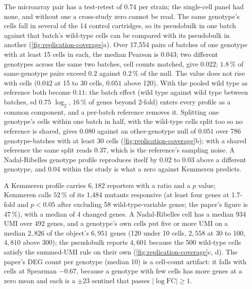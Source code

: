  The microarray pair has a test-retest of
$0.74$ per strain; the single-cell panel had none, and without one a cross-study zero
cannot be read. The same genotype's cells fall in several of the 14 control cartridges,
so its pseudobulk in one batch against that batch's wild-type cells can be compared with
its pseudobulk in another (\cref{fig:replication-coverage}a). Over 17{,}554 pairs of
batches of one genotype with at least 15 cells in each, the median Pearson is $0.043$;
two different genotypes across the same two batches, cell counts matched, give $0.022$;
$1.8\,\%$ of same-genotype pairs exceed $0.2$ against $0.2\,\%$ of the null. The value
does not rise with cells ($0.042$ at 15 to 30 cells, $0.051$ above 120). With the pooled
wild type as reference both become $0.11$: the batch effect (wild type against wild
type between batches, sd $0.75$ $\log_2$, $16\,\%$ of genes beyond 2-fold) enters every
profile as a common component, and a per-batch reference removes it. Splitting one
genotype's cells within one batch in half, with the wild-type cells split too so no
reference is shared, gives $0.080$ against an other-genotype null of $0.051$ over 786
genotype-batches with at least 30 cells (\cref{fig:replication-coverage}b); with a
shared reference the same split reads $0.37$, which is the reference's sampling noise. A
Nadal-Ribelles genotype profile reproduces itself by $0.02$ to $0.03$ above a different
genotype, and $0.04$ within the study is what a zero against Kemmeren predicts.

 A Kemmeren profile carries $6{,}182$ reporters with a ratio
and a $p$ value; Kemmeren calls $52\,\%$ of its 1{,}484 mutants responsive (at least
four genes at 1.7-fold and $p < 0.05$ after excluding 58 wild-type-variable genes; the
paper's figure is $47\,\%$), with a median of 4 changed genes. A Nadal-Ribelles cell has
a median 934 UMI over 492 genes, and a genotype's own cells put five or more UMI on a
median $2{,}826$ of the object's $6{,}951$ genes (120 under 10 cells, $2{,}558$ at 30 to
100, $4{,}810$ above 300); the pseudobulk reports $4{,}601$ because the 500 wild-type
cells satisfy the summed-UMI rule on their own (\cref{fig:replication-coverage}c, d).
The paper's DEG count per genotype (median 10) is a cell-count artifact: it falls with
cells at Spearman $-0.67$, because a genotype with few cells has more genes at a zero
mean and each is a $\pm 23$ sentinel that passes $|\log\mathrm{FC}| \ge 1$.


